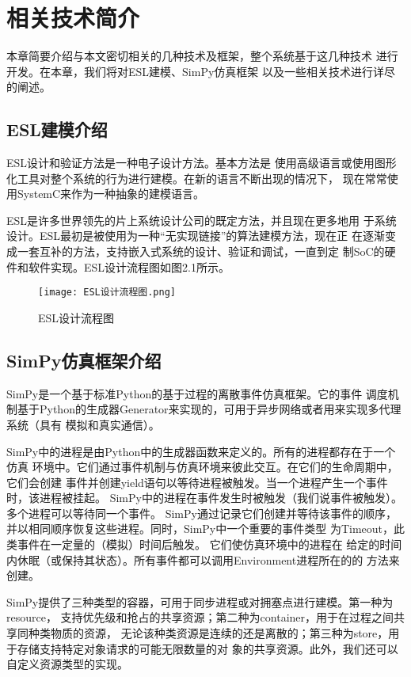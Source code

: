 
\chapter{相关技术简介}
本章简要介绍与本文密切相关的几种技术及框架，整个系统基于这几种技术
进行开发。在本章，我们将对ESL建模、SimPy仿真框架
以及一些相关技术进行详尽的阐述。

\section{ESL建模介绍}
ESL设计和验证方法是一种电子设计方法。基本方法是
使用高级语言或使用图形化工具对整个系统的行为进行建模。在新的语言不断出现的情况下，
现在常常使用SystemC来作为一种抽象的建模语言。

ESL是许多世界领先的片上系统设计公司的既定方法，并且现在更多地用
于系统设计。ESL最初是被使用为一种“无实现链接”的算法建模方法，现在正
在逐渐变成一套互补的方法，支持嵌入式系统的设计、验证和调试，一直到定
制SoC的硬件和软件实现\cite{41}。ESL设计流程图\cite{42}如图2.1所示。

\begin{figure}
  \centering
  \texttt{[image: ESL设计流程图.png]}
  \caption{ESL设计流程图}
  \label{fig:badge}
\end{figure}

\section{SimPy仿真框架介绍}
SimPy是一个基于标准Python的基于过程的离散事件仿真框架。它的事件
调度机制基于Python的生成器Generator来实现的，可用于异步网络或者用来实现多代理系统（具有
模拟和真实通信）。

SimPy中的进程是由Python中的生成器函数来定义的。所有的进程都存在于一个仿真
环境中。它们通过事件机制与仿真环境来彼此交互。在它们的生命周期中，它们会创建
事件并创建yield语句以等待进程被触发。当一个进程产生一个事件时，该进程被挂起。
SimPy中的进程在事件发生时被触发（我们说事件被触发）。多个进程可以等待同一个事件。
SimPy通过记录它们创建并等待该事件的顺序，并以相同顺序恢复这些进程。同时，SimPy中一个重要的事件类型
为Timeout，此类事件在一定量的（模拟）时间后触发。 它们使仿真环境中的进程在
给定的时间内休眠（或保持其状态）。所有事件都可以调用Environment进程所在的的
方法来创建。

SimPy提供了三种类型的容器，可用于同步进程或对拥塞点进行建模。第一种为resource，
支持优先级和抢占的共享资源；第二种为container，用于在过程之间共享同种类物质的资源，
无论该种类资源是连续的还是离散的；第三种为store，用于存储支持特定对象请求的可能无限数量的对
象的共享资源。此外，我们还可以自定义资源类型的实现。

